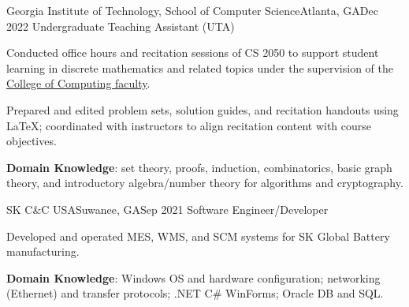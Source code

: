 \begin{resume-itemize}
  {Georgia Institute of Technology, School of Computer Science}{Atlanta, GA}{Dec 2022}
  {Undergraduate Teaching Assistant (UTA)}
  \item Conducted office hours and recitation sessions of CS 2050 to support student learning in 
  discrete mathematics and related topics under the supervision of the 
  \href{https://www.cc.gatech.edu/people/faculty}{College of Computing faculty}.
  \item Prepared and edited problem sets, solution guides, and recitation handouts using 
  \LaTeX; coordinated with instructors to align recitation content with course objectives.
  \item \textbf{Domain Knowledge}: set theory, proofs, induction, combinatorics, 
  basic graph theory, and introductory algebra/number theory for algorithms and cryptography.
\end{resume-itemize}
\begin{resume-itemize}
  {SK C\&C USA}{Suwanee, GA}{Sep 2021}
  {Software Engineer/Developer}
  \item Developed and operated MES, WMS, and SCM systems for SK Global Battery manufacturing.
  \item \textbf{Domain Knowledge}: Windows OS and hardware configuration; networking (Ethernet) and transfer protocols; .NET C\# WinForms; Oracle DB and SQL.
\end{resume-itemize}
